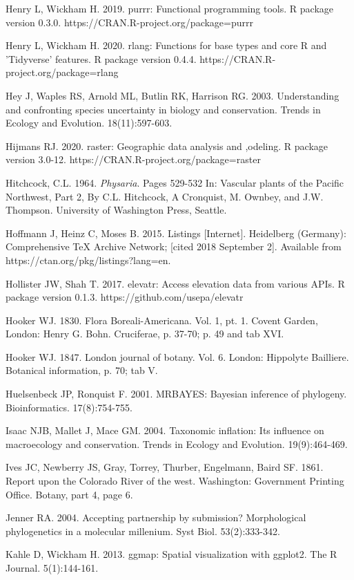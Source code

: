 Henry L, Wickham H. 2019. purrr: Functional programming tools. R package version 0.3.0. https://CRAN.R-project.org/package=purrr

Henry L, Wickham H. 2020. rlang: Functions for base types and core R and 'Tidyverse' features. R package version 0.4.4. https://CRAN.R-project.org/package=rlang

Hey J, Waples RS, Arnold ML, Butlin RK, Harrison RG. 2003. Understanding and confronting species uncertainty in biology and conservation. Trends in Ecology and Evolution. 18(11):597-603.

Hijmans RJ. 2020. raster: Geographic data analysis and ,odeling. R package version 3.0-12. https://CRAN.R-project.org/package=raster

Hitchcock, C.L. 1964. \textit{Physaria}. Pages 529-532 In: Vascular plants of the Pacific Northwest, Part 2, By C.L. Hitchcock, A Cronquist, M. Ownbey, and J.W. Thompson. University of Washington Press, Seattle.

Hoffmann J, Heinz C, Moses B. 2015. Listings [Internet]. Heidelberg (Germany): Comprehensive TeX Archive Network; [cited 2018 September 2]. Available from https://ctan.org/pkg/listings?lang=en.

Hollister JW, Shah T. 2017. elevatr: Access elevation data from various APIs. R package version 0.1.3. https://github.com/usepa/elevatr

Hooker WJ. 1830. Flora Boreali-Americana. Vol. 1, pt. 1. Covent Garden, London: Henry G. Bohn. Cruciferae, p. 37-70; p. 49 and tab XVI.

Hooker WJ. 1847. London journal of botany. Vol. 6. London: Hippolyte Bailliere. Botanical information, p. 70; tab V.

Huelsenbeck JP, Ronquist F. 2001. MRBAYES: Bayesian inference of phylogeny. Bioinformatics. 17(8):754-755.

Isaac NJB, Mallet J, Mace GM. 2004. Taxonomic inflation: Its influence on macroecology and conservation. Trends in Ecology and Evolution. 19(9):464-469.

Ives JC, Newberry JS, Gray, Torrey, Thurber, Engelmann, Baird SF. 1861. Report upon the Colorado River of the west. Washington: Government Printing Office. Botany, part 4, page 6.

Jenner RA. 2004. Accepting partnership by submission? Morphological phylogenetics in a molecular millenium. Syst Biol. 53(2):333-342.

Kahle D, Wickham H. 2013. ggmap: Spatial visualization with ggplot2. The R Journal. 5(1):144-161.

